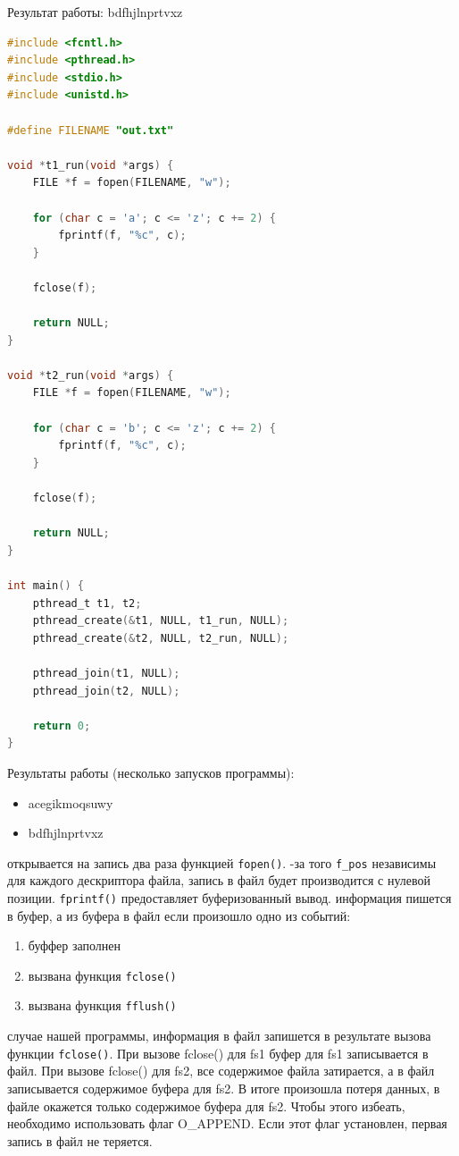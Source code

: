\documentclass[12pt]{report}
\begin{document}
Результат работы: bdfhjlnprtvxz

\begin{lstlisting}[label=first,caption=Программа 3 (многопоточная), language=C]
#include <fcntl.h>
#include <pthread.h>
#include <stdio.h>
#include <unistd.h>

#define FILENAME "out.txt"

void *t1_run(void *args) {
	FILE *f = fopen(FILENAME, "w");
	
	for (char c = 'a'; c <= 'z'; c += 2) {
		fprintf(f, "%c", c);
	}
	
	fclose(f);
	
	return NULL;
}

void *t2_run(void *args) {
	FILE *f = fopen(FILENAME, "w");
	
	for (char c = 'b'; c <= 'z'; c += 2) {
		fprintf(f, "%c", c);
	}
	
	fclose(f);
	
	return NULL;
}

int main() {
	pthread_t t1, t2;
	pthread_create(&t1, NULL, t1_run, NULL);
	pthread_create(&t2, NULL, t2_run, NULL);
	
	pthread_join(t1, NULL);
	pthread_join(t2, NULL);
	
	return 0;
}
\end{lstlisting}

Результаты работы (несколько запусков программы): 
\begin{itemize}
	\item acegikmoqsuwy
	\item bdfhjlnprtvxz
\end{itemize}

 открывается на запись два раза функцией \texttt{fopen()}.
-за того \texttt{f\_pos} независимы для каждого дескриптора файла, запись в файл будет производится с нулевой позиции.
 \texttt{fprintf()} предоставляет буферизованный вывод.
 информация пишется в буфер, а из буфера в файл если произошло одно из
событий:
\begin{enumerate}
	\item буффер заполнен
	\item вызвана функция \texttt{fclose()}
	\item вызвана функция \texttt{fflush()}
\end{enumerate}
 случае нашей программы, информация в файл запишется в результате вызова функции \texttt{fclose()}. При вызове fclose() для fs1 буфер для fs1 записывается в файл. При вызове fclose() для fs2, все содержимое файла затирается, а в файл записывается содержимое буфера для fs2. В итоге произошла потеря данных, в файле окажется только содержимое буфера для fs2. Чтобы этого избеать, необходимо использовать флаг O\_APPEND. Если этот флаг установлен, первая запись в файл не теряется. 
\end{document}
